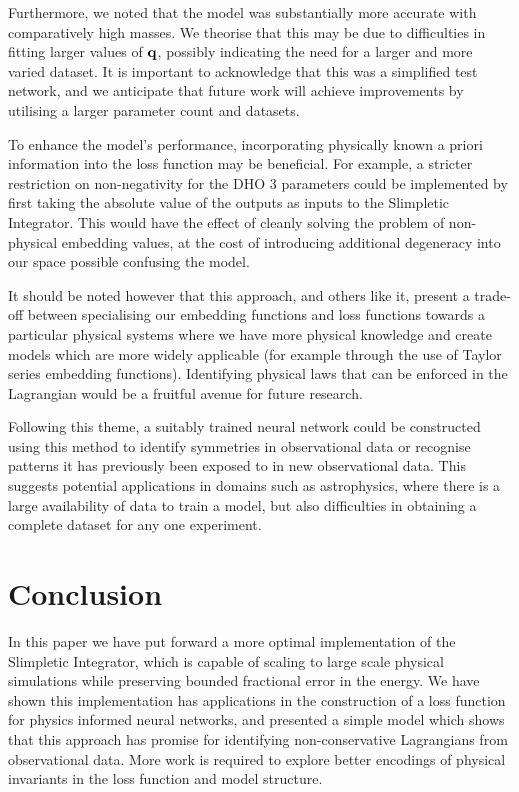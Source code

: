 Furthermore, we noted that the model was substantially more accurate with comparatively high masses. We theorise that this may be due to difficulties in fitting larger values of $\vb{q}$, possibly indicating the need for a larger and more varied dataset. It is important to acknowledge that this was a simplified test network, and we anticipate that future work will achieve improvements by utilising a larger parameter count and datasets.

To enhance the model's performance, incorporating physically known a priori information into the loss function may be beneficial. For example, a stricter restriction on non-negativity for the DHO 3 parameters could be implemented by first taking the absolute value of the outputs as inputs to the Slimpletic Integrator. This would have the effect of cleanly solving the problem of non-physical embedding values, at the cost of introducing additional degeneracy into our space possible confusing the model.

It should be noted however that this approach, and others like it, present a trade-off between specialising our embedding functions and loss functions towards a particular physical systems where we have more physical knowledge and create models which are more widely applicable (for example through the use of Taylor series embedding functions).
Identifying physical laws that can be enforced in the Lagrangian would be a fruitful avenue for future research.

Following this theme, a suitably trained neural network could be constructed using this method to identify symmetries in observational data or recognise patterns it has previously been exposed to in new observational data. This suggests potential applications in domains such as astrophysics, where there is a large availability of data to train a model, but also difficulties in obtaining a complete dataset for any one experiment.

\section{Conclusion}

In this paper we have put forward a more optimal implementation of the Slimpletic Integrator, which is capable of scaling to large scale physical simulations while preserving bounded fractional error in the energy. We have shown this implementation has applications in the construction of a loss function for physics informed neural networks, and presented a simple model which shows that this approach has promise for identifying non-conservative Lagrangians from observational data. More work is required to explore better encodings of physical invariants in the loss function and model structure.
